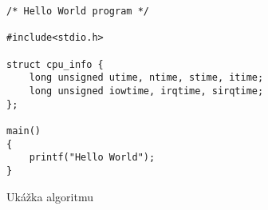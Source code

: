 \begin{algorithm}
%
\begin{lstlisting}
/* Hello World program */

#include<stdio.h>

struct cpu_info {
    long unsigned utime, ntime, stime, itime;
    long unsigned iowtime, irqtime, sirqtime;
};

main()
{
    printf("Hello World");
}\end{lstlisting}
 \caption{Ukážka algoritmu}
 \label{euclid}
\end{algorithm}